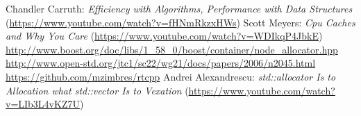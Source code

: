 \documentclass[11pt]{article}
\begin{document}
\begin{thebibliography}{9}

   Chandler Carruth: {\it Efficiency with Algorithms, Performance
  with Data Structures} (\url{https://www.youtube.com/watch?v=fHNmRkzxHWs})
   Scott Meyers: {\it Cpu Caches and Why You Care} (\url{https://www.youtube.com/watch?v=WDIkqP4JbkE})
   \url{http://www.boost.org/doc/libs/1_58_0/boost/container/node_allocator.hpp}
   \url{http://www.open-std.org/jtc1/sc22/wg21/docs/papers/2006/n2045.html}
   \url{https://github.com/mzimbres/rtcpp}
   Andrei Alexandrescu: {\it std::allocator Is to Allocation what
  std::vector Is to Vexation} (\url{https://www.youtube.com/watch?v=LIb3L4vKZ7U})

\end{thebibliography}
\end{document}
